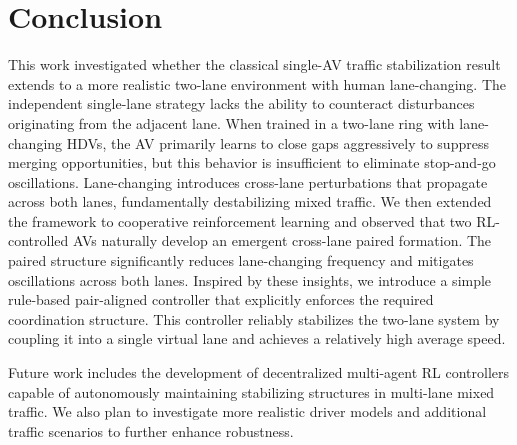 \documentclass{ifacconf}
\newcommand{\1}{\mbox{1}\hspace{-0.25em}\mbox{l}}
\begin{document}
\section{Conclusion}
\label{sec:Conclusion}
This work investigated whether the classical single-AV traffic stabilization result extends to a more realistic two-lane environment with human lane-changing. The independent single-lane strategy lacks the ability to counteract disturbances originating from the adjacent lane. When trained in a two-lane ring with lane-changing HDVs, the AV primarily learns to close gaps aggressively to suppress merging opportunities, but this behavior is insufficient to eliminate stop-and-go oscillations. Lane-changing introduces cross-lane perturbations that propagate across both lanes, fundamentally destabilizing mixed traffic. We then extended the framework to cooperative reinforcement learning and observed that two RL-controlled AVs naturally develop an emergent cross-lane paired formation. The paired structure significantly reduces lane-changing frequency and mitigates oscillations across both lanes. Inspired by these insights, we introduce a simple rule-based 
pair-aligned controller that explicitly enforces the required coordination 
structure. This controller reliably stabilizes the two-lane system by coupling it into a single virtual lane and achieves a relatively high average speed.

Future work includes the development of decentralized multi-agent RL controllers capable of autonomously maintaining stabilizing structures in multi-lane mixed traffic. We also plan to investigate more realistic driver models and additional traffic scenarios to further enhance robustness. 


\balance


  
\end{document}

